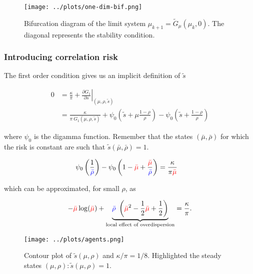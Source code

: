 \documentclass[american, abstract=on]{scrartcl}
\theoremstyle{plain}
\begin{document}
\begin{figure}[H]
  \centering
  \texttt{[image: ../plots/one-dim-bif.png]}
  \caption{Bifurcation diagram of the limit system $\mu_{k + 1} = \tilde{G}_{\mu}(\mu_k, 0)$. The diagonal represents the stability condition.}
  \label{fig:one-dimensional-bifurcation}
\end{figure}

\subsubsection{Introducing correlation risk}

The first order condition gives us an implicit definition of $\tilde{s}$ 

\begin{equation}
  \begin{split}
    0 &= \frac{\kappa}{\pi} + \left. \frac{\partial G_1}{\partial s} \right\vert_{(\mu, \rho, \tilde{s})}  \\
    &= \frac{\kappa}{\pi \ G_1(\mu, \rho, \tilde{s})} + \psi_0\left(\tilde{s} + \mu \frac{1 - \rho}{\rho} \right) - \psi_0\left(\tilde{s} + \frac{1 - \rho}{\rho} \right)  
  \end{split}
\end{equation}

where $\psi_0$ is the digamma function. Remember that the states $(\bar{\mu}, \bar{\rho})$ for which the risk is constant are such that $\tilde{s}(\bar{\mu}, \bar{\rho})= 1$.

\begin{equation}
  \begin{split}
    \psi_0\left(\frac{1}{\textcolor{blue}{\bar{\rho}}} \right) - \psi_0\left(1 - \textcolor{red}{\bar{\mu}} + \frac{ \textcolor{red}{\bar{\mu}} }{\textcolor{blue}{\bar{\rho}}} \right) &= \frac{\kappa}{\pi \textcolor{red}{\bar{\mu}}}
  \end{split}
\end{equation}

which can be approximated, for small $\rho$, as

\begin{equation}
   - \textcolor{red}{\bar{\mu}}\log(\textcolor{red}{\bar{\mu}}) + \underbrace{\textcolor{blue}{\bar{\rho}} \ \left(\textcolor{red}{\bar{\mu}}^2 - \frac{1}{2}\textcolor{red}{\bar{\mu}} + \frac{1}{2}\right)}_{\text{local effect of overdispersion}} = \frac{\kappa}{\pi}.
\end{equation}

\begin{figure}[H]
  \centering
  \texttt{[image: ../plots/agents.png]}
  \caption{Contour plot of $\tilde{s}(\mu, \rho)$ and $\kappa / \pi = 1 / 8$. Highlighted the steady states $(\mu, \rho): \tilde{s}(\mu, \rho) = 1$.}
  \label{fig:agents-optimum}
\end{figure}
\end{document}
